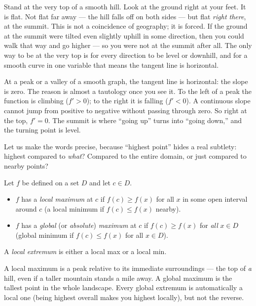 Stand at the very top of a smooth hill. Look at the ground right at your feet.
It is flat. Not flat far away --- the hill falls off on both sides --- but flat
\emph{right there}, at the summit. This is not a coincidence of geography; it is
forced. If the ground at the summit were tilted even slightly uphill in some
direction, then you could walk that way and go higher --- so you were not at the
summit after all. The only way to be at the very top is for every direction to be
level or downhill, and for a smooth curve in one variable that means the tangent
line is horizontal.

\begin{intuitionbox}
At a peak or a valley of a smooth graph, the tangent line is horizontal: the
slope is zero. The reason is almost a tautology once you see it. To the left of a
peak the function is climbing ($f'>0$); to the right it is falling ($f'<0$). A
continuous slope cannot jump from positive to negative without passing through
zero. So right at the top, $f'=0$. The summit is where ``going up'' turns into
``going down,'' and the turning point is level.
\end{intuitionbox}

Let us make the words precise, because ``highest point'' hides a real subtlety:
highest compared to \emph{what}? Compared to the entire domain, or just compared
to nearby points?

\begin{definition}\label{ch16:def-extrema}
Let $f$ be defined on a set $D$ and let $c \in D$.
\begin{itemize}
\item $f$ has a \emph{local maximum} at $c$ if $f(c) \ge f(x)$ for all $x$ in some
open interval around $c$ (a local minimum if $f(c)\le f(x)$ nearby).
\item $f$ has a \emph{global} (or \emph{absolute}) \emph{maximum} at $c$ if
$f(c)\ge f(x)$ for \emph{all} $x \in D$ (global minimum if $f(c)\le f(x)$ for all
$x\in D$).
\end{itemize}
A \emph{local extremum} is either a local max or a local min.
\end{definition}

A local maximum is a peak relative to its immediate surroundings --- the top of
\emph{a} hill, even if a taller mountain stands a mile away. A global maximum is
the tallest point in the whole landscape. Every global extremum is automatically a
local one (being highest overall makes you highest locally), but not the reverse.

